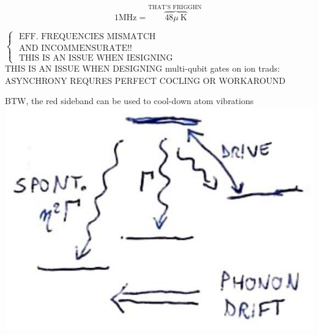 \documentclass[10pt]{article}
\begin{document}
$$
1 \mathrm{MHz}=\overbrace{48 \mu \mathrm{~K}}^{\text {THAT'S FRIGGHN }}
$$

$\left\{\begin{array}{l}\text { EFF. FREQUENCIES MISMATCH } \\ \text { AND INCOMMENSURATE!! } \\ \text { THIS IS AN ISSUE WHEN IESIGNING }\end{array}\right.$\\
THIS IS AN ISSUE WHEN DESIGNING multi-qubit gates on ion trads: ASYNCHRONY REQURES PERFECT COCLING OR WORKAROUND

BTW, the red sideband can be used to cool-down atom vibrations\\
\includegraphics[max width=\textwidth, center]{2025_10_16_9146de9f5ba4f09535e7g-6}
\end{document}
